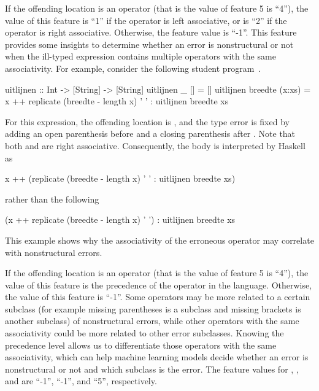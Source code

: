 \documentclass[12pt]{report}	%
\begin{document}
%
If the offending location is an operator
(that is the value of feature 5 is ``4''),
the value of this feature is ``1'' if the operator
is left associative, or is ``2'' if the operator is
right associative. 
Otherwise, the feature value is ``-1''.
%
%
This feature provides some insights to determine 
whether an error is nonstructural or not
when the ill-typed expression
contains multiple operators with the same associativity.
For example, consider the following 
student program~\cite{Hage09:Neon}.
%
\begin{program}
uitlijnen :: Int -> [String] -> [String]
uitlijnen _ [] = []
uitlijnen breedte (x:xs) = x ++ replicate (breedte - length x) ' ' 
                              : uitlijnen breedte xs
\end{program}
%
For this expression, the offending location
is \prog{++}, and the type error is fixed
by adding an open parenthesis before  and 
a closing parenthesis after \progsq{ }.
%
Note that both \prog{++} and \prog{:} are
right associative. Consequently, the body is 
interpreted by Haskell as
\begin{program}
x ++ (replicate (breedte - length x) ' ' : uitlijnen breedte xs)
\end{program}
rather than the following
%
\begin{program}
(x ++ replicate (breedte - length x) ' ') : uitlijnen breedte xs
\end{program}
%
This example shows why the associativity of the erroneous operator
may correlate with nonstructural errors.


If the offending location is an operator
(that is the value of feature 5 is ``4''),
the value of this feature is the precedence of
the operator in the language. Otherwise, the 
value of this feature is ``-1''.
Some operators may be more related to a certain
subclass (for example missing parentheses is a subclass
and missing brackets is another subclass) of nonstructural errors,
while other operators with the same associativity
could be more related to other error subclasses. 
%
Knowing the precedence level allows us
to differentiate those operators with the same
associativity, which can help machine learning models
decide whether an error is nonstructural or not and 
which subclass is the error.
%
The feature values for
, 
, and
are ``-1'', ``-1'', and ``5'', respectively.
\end{document}
